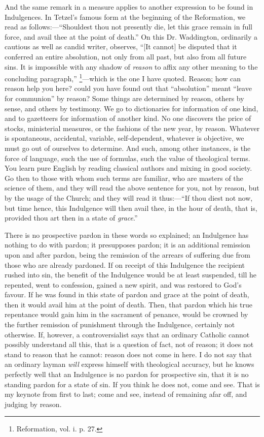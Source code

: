 And the same remark in a measure applies to another
expression to be found in Indulgences. In Tetzel's famous
form at the beginning of the Reformation, we read as follows:—``Shouldest thou not presently die, let
this grace remain in full force, and avail thee at the
point of death.'' On this Dr. Waddington, ordinarily
a cautious as well as candid writer, observes, ``[It
cannot] be disputed that it conferred an entire
absolution, not only from all past, but also from all
future sins. It is impossible with any shadow of \emph{reason}
to affix any other meaning to the concluding
paragraph,'' \footnote{Reformation, vol. i. p. 27.}—which is the one I have quoted. Reason; how can
reason help you here? could you have found out that
``absolution'' meant ``leave for
communion'' by reason? Some things are determined by
reason, others by sense, and others by testimony. We go
to dictionaries for information of one kind, and to
gazetteers for information of another kind. No one
discovers the price of stocks, ministerial measures, or
the fashions of the new year, by reason. Whatever is
spontaneous, accidental, variable, self-dependent,
whatever is objective, we must go out of ourselves to
determine. And such, among other instances, is the force
of language, such the use of formulas, such the value of
theological terms. You learn pure English by reading
classical authors and mixing in good society. Go then to
those with whom such terms are familiar, who are masters
of the science of them, and they will read the above
sentence for you, not by reason, but by the usage of the
Church; and they will read it thus:—``If thou diest
not now, but time hence, this Indulgence will then avail
thee, in the hour of death, that is, provided thou art
then in a state of \emph{grace}.''

There is no prospective pardon in these words so
explained; an Indulgence has nothing to do with pardon;
it presupposes pardon; it is an additional remission upon
and after pardon, being the remission of the arrears of
suffering due from those who are already pardoned. If on
receipt of this Indulgence the recipient rushed into sin,
the benefit of the Indulgence would be at least
suspended, till he repented, went to confession, gained a
new spirit, and was restored to God's favour. If he was
found in this state of pardon and grace at the point of
death, then it would avail him at the point of death.
Then, that pardon which his true repentance would gain
him in the sacrament of penance, would be crowned by the
further remission of punishment through the Indulgence,
certainly not otherwise. If, however, a controversialist
says that an ordinary Catholic cannot possibly understand
all this, that is a question of fact, not of reason; it
does not stand to reason that he cannot: reason does not
come in here. I do not say that an ordinary layman \emph{will}
express himself with theological accuracy, but he knows
perfectly well that an Indulgence is no pardon for
prospective sin, that it is no standing pardon for a
state of sin. If you think he does not, come and see.
That is my keynote from first to last; come and see,
instead of remaining afar off, and judging by reason.

